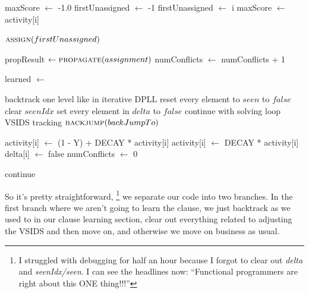 \begin{algorithm}[H]
\caption{cVSIDS Solving Method}\label{alg:41}
\begin{algorithmic}[1]

\State {}

        \State maxScore $\gets$ -1.0
        \State firstUnassigned $\gets$ -1
                    \State firstUnassigned $\gets$ i
                    \State maxScore $\gets$ activity[i]
                \EndIf
            \EndIf
        \EndFor

        \State $\Call{assign}{firstUnassigned}$
    \EndIf

    \State propResult $\gets \Call{propagate}{assignment}$
        \State numConflicts $\gets$ numConflicts + 1

        \State learned $\gets$ 

            \State backtrack one level like in iterative DPLL
            \State reset every element to $seen$ to $false$
            \State clear $seenIdx$
            \State set every element in $delta$ to $false$
            \State continue with solving loop
        \Else
            \State VSIDS tracking
            \State $\Call{backjump}{backJumpTo}$
        \EndIf

        \State {}

                \State activity[i] $\gets$ (1 - Y) + DECAY * activity[i]
            \Else
                \State activity[i] $\gets$ DECAY * activity[i]
            \EndIf
            \State delta[i] $\gets$ false
        \EndFor
        \State numConflicts $\gets$ 0

        \State continue
    \EndIf
\EndWhile

\EndProcedure
\end{algorithmic}
\end{algorithm}

\noindent
So it's pretty straightforward,
\footnote{I struggled with debugging for half an hour because I forgot to clear out
\textit{delta} and \textit{seenIdx/seen}. I can see the headlines now: 
``Functional programmers are right about this ONE thing!!!''}
we separate our code into two branches. In the first branch where we aren't going to 
learn the clause, we just backtrack as we used to in our clause learning section, clear 
out everything related to adjusting the VSIDS and then move on, and otherwise we move on 
business as usual.

